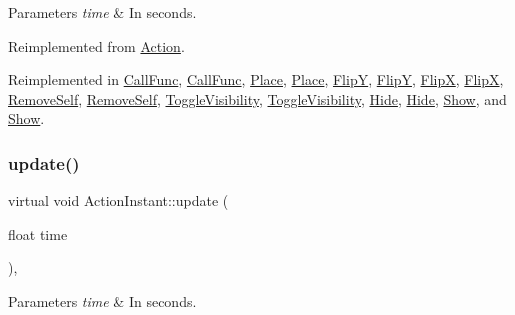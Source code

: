 \begin{DoxyParams}{Parameters}
{\em time} & In seconds. \\
\hline
\end{DoxyParams}


Reimplemented from \hyperlink{classAction_a937e646e63915e33ad05ba149bfcf239}{Action}.



Reimplemented in \hyperlink{classCallFunc_a6684fe74294f93ba202ae8599e890c0c}{Call\+Func}, \hyperlink{classCallFunc_a935c2f87c96d2a5b9e78b1ca875e9d7a}{Call\+Func}, \hyperlink{classPlace_a1ab3900efa596c098e0fb84232050435}{Place}, \hyperlink{classPlace_ac1096e69dd514a74920ae060ab1b671f}{Place}, \hyperlink{classFlipY_a51936fab0a0dc692e381a8a89c3d8e43}{FlipY}, \hyperlink{classFlipY_a75442be63f171b641a1f98165e915439}{FlipY}, \hyperlink{classFlipX_a7722cb20061b1e1708581585a1e2f1b3}{FlipX}, \hyperlink{classFlipX_ac83f96bee0cebd14b4d06813bd259047}{FlipX}, \hyperlink{classRemoveSelf_ae77d0c282e5eba09f092ebec570fbc71}{Remove\+Self}, \hyperlink{classRemoveSelf_a362b4453b4b247e9b4b7e51fc1bd7c44}{Remove\+Self}, \hyperlink{classToggleVisibility_a2d217511fd3f28ee096e0de1aacf21b4}{Toggle\+Visibility}, \hyperlink{classToggleVisibility_a7a00173aaded366259698c37ebbb2ca0}{Toggle\+Visibility}, \hyperlink{classHide_ab63f0961b2bac19ff3fa4581e7342d9d}{Hide}, \hyperlink{classHide_a108b8127537cc5da94f63444e3fb23f3}{Hide}, \hyperlink{classShow_a83db57e795e0269471d06d4e49986ab0}{Show}, and \hyperlink{classShow_a81b501eda1e567344ad4ecf695b1be86}{Show}.

\mbox{\label{classActionInstant_ab1da09b6408b3477b7ff75be8e58de0d}} 
\subsubsection{\texorpdfstring{update()}{update()}\hspace{0.1cm}{\footnotesize\ttfamily [2/2]}}
{\footnotesize\ttfamily virtual void Action\+Instant\+::update (\begin{DoxyParamCaption}\item[{float}]{time }\end{DoxyParamCaption})\hspace{0.3cm}{\ttfamily [override]}, {\ttfamily [virtual]}}


\begin{DoxyParams}{Parameters}
{\em time} & In seconds. \\
\hline
\end{DoxyParams}


